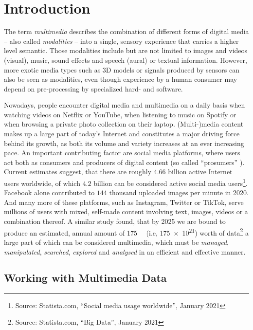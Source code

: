 \chapter{Introduction}
\label{chapter:introduction}

The term \emph{multimedia} describes the combination of different forms of digital media -- also called \emph{modalities} -- into a single, sensory experience that carries a higher level semantic. Those modalities include but are not limited to images and videos (visual), music, sound effects and speech (aural) or textual information. However, more exotic media types such as 3D models or signals produced by sensors can also be seen as modalities, even though experience by a human consumer may depend on pre-processing by specialized hard- and software.

Nowadays, people encounter digital media and multimedia on a daily basis when watching videos on Netflix or YouTube, when listening to music on Spotify or when browsing a private photo collection on their laptop. (Multi-)media content makes up a large part of today's Internet and constitutes a major driving force behind its growth, as both its volume and variety increases at an ever increasing pace. An important contributing factor are social media platforms, where users act both as consumers and producers of digital content (so called ``prosumers'' \cite{Ritzer:2010Production,Ritzer2012:Coming}). Current estimates suggest, that there are roughly $4.66$ billion active Internet users worldwide, of which $4.2$ billion can be considered active social media users\footnote{Source: Statista.com, ``Social media usage worldwide'', January 2021}. Facebook alone contributed to $144$ thousand uploaded images per minute in 2020. And many more of these  platforms, such as Instagram, Twitter or TikTok, serve millions of users with mixed, self-made content involving text, images, videos or a combination thereof. A similar study found, that by 2025 we are bound to produce an estimated, annual amount of \SI{175}{\zetta\byte} (i.e, \SI{175e21}{\byte}) worth of data\footnote{Source: Statista.com, ``Big Data'', January 2021} a large part of which can be considered multimedia, which must be \emph{managed}, \emph{manipulated}, \emph{searched}, \emph{explored} and \emph{analysed} in an efficient and effective manner.

\section{Working with Multimedia Data}

